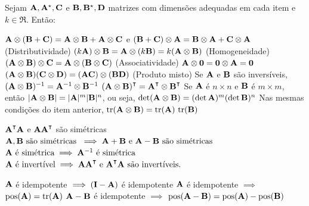 \begin{theorem}
	Sejam $\mathbf{A}, \mathbf{A}^\star, \mathbf{C}$ e $\mathbf{B}, \mathbf{B}^\star, \mathbf{D}$ matrizes com dimensões adequadas em cada item e $k \in \Re$. Então:
	\begin{outline}[enumerate]
		\1 $\mathbf{A} \otimes (\mathbf{B} + \mathbf{C}) = \mathbf{A} \otimes \mathbf{B} + \mathbf{A} \otimes \mathbf{C}$ e $(\mathbf{B} + \mathbf{C}) \otimes \mathbf{A} = \mathbf{B} \otimes \mathbf{A} + \mathbf{C} \otimes \mathbf{A}$ (Distributividade)
		\1 $(k\mathbf{A}) \otimes \mathbf{B} = \mathbf{A} \otimes (k\mathbf{B}) = k(\mathbf{A} \otimes \mathbf{B})$ (Homogeneidade)
		\1 $(\mathbf{A} \otimes \mathbf{B}) \otimes \mathbf{C} = \mathbf{A} \otimes (\mathbf{B} \otimes \mathbf{C})$ (Associatividade)
		\1 $\mathbf{A} \otimes \mathbf{0} = \mathbf{0} \otimes \mathbf{A} = \mathbf{0}$
		\1 $(\mathbf{A} \otimes \mathbf{B})(\mathbf{C} \otimes \mathbf{D}) = (\mathbf{A} \mathbf{C})\otimes(\mathbf{B} \mathbf{D})$ (Produto misto)
		\1 Se $\mathbf{A}$ e $\mathbf{B}$ são inversíveis, $(\mathbf{A} \otimes \mathbf{B})^{-1} = \mathbf{A}^{-1} \otimes \mathbf{B}^{-1}$
		\1 $(\m A \otimes \m B)\T = \m A\T \otimes \m B\T$
		\1 Se $\mathbf{A}$ é $n\times n$ e $\mathbf{B}$ é $m \times m$, então $|\mathbf{A} \otimes \mathbf{B}| = |\mathbf{A}|^m |\mathbf{B}|^n$, ou seja, $\det(\mathbf{A} \otimes \mathbf{B}) = (\det \mathbf{A})^m (\det \mathbf{B})^n$
		\1 Nas mesmas condições do item anterior, $\operatorname{tr}(\mathbf{A} \otimes \mathbf{B}) = \operatorname{tr}(\mathbf{A})\,\operatorname{tr}(\mathbf{B})$
	\end{outline}
\end{theorem}

\begin{theorem}
	\leavevmode
	\begin{outline}[enumerate]
		\1 $\m{A}\T \m{A}$ e $\m{A} \m{A}\T$ são simétricas
		\1 \( \mathbf{A}, \mathbf{B} \text{ são simétricas } \implies \mathbf{A}+\mathbf{B} \text{ e } \mathbf{A}-\mathbf{B}
		 \text{ são simétricas} \)
		 \1 \( \mathbf{A} \text{ é simétrica} \implies \mathbf{A}^{-1} \text{ é simétrica } \)
		 \1 \( \m{A} \text{ é invertível} \implies \m{A}\m{A}\T \text{ e }  \m{A}\T\m{A} \text{ são invertíveis.}  \)
	\end{outline}
\end{theorem}

\begin{theorem}
	\leavevmode
	\begin{outline}[enumerate]
		\1 $\mathbf{A}$ é idempotente $\implies (\mathbf{I}-\mathbf{A})$ é idempotente 
		\1 $\mathbf{A}$ é idempotente $\implies$ $\operatorname{pos}(\mathbf{A}) = \operatorname{tr}(\mathbf{A})$
		\1 $\mathbf{A}-\mathbf{B}$ é idempotente $\implies$ $\operatorname{pos}(\mathbf{A}-\mathbf{B}) = \operatorname{pos}(\mathbf{A}) - \operatorname{pos}(\mathbf{B})$
	\end{outline}
\end{theorem}

